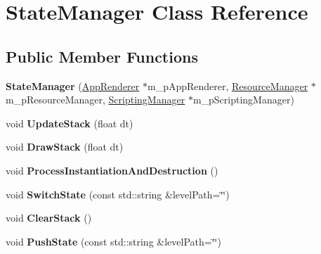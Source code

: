 \hypertarget{classStateManager}{}\section{State\+Manager Class Reference}
\label{classStateManager}
\subsection*{Public Member Functions}
\begin{DoxyCompactItemize}
\item 
\mbox{\label{classStateManager_ace918db0f769af43e0067ac425ef640a}} 
{\bfseries State\+Manager} (\hyperlink{classAppRenderer}{App\+Renderer} $\ast$m\+\_\+p\+App\+Renderer, \hyperlink{classResourceManager}{Resource\+Manager} $\ast$m\+\_\+p\+Resource\+Manager, \hyperlink{classScriptingManager}{Scripting\+Manager} $\ast$m\+\_\+p\+Scripting\+Manager)
\item 
\mbox{\label{classStateManager_a5e4bd4cb8c5928d33a04506dc8c8f350}} 
void {\bfseries Update\+Stack} (float dt)
\item 
\mbox{\label{classStateManager_a2c6bb716a4c6a388f971544c6c23e1d9}} 
void {\bfseries Draw\+Stack} (float dt)
\item 
\mbox{\label{classStateManager_ac88d4e1ff5fab43b754bd3831be4ca97}} 
void {\bfseries Process\+Instantiation\+And\+Destruction} ()
\item 
\mbox{\label{classStateManager_aca3d023f833f9b85b28668e3d3acd2d3}} 
void {\bfseries Switch\+State} (const std\+::string \&level\+Path=\char`\"{}\char`\"{})
\item 
\mbox{\label{classStateManager_a59a5d52d71d785b267f50f386b554787}} 
void {\bfseries Clear\+Stack} ()
\item 
\mbox{\label{classStateManager_a608027305a6a97bdbc958c7e68fcb5bc}} 
void {\bfseries Push\+State} (const std\+::string \&level\+Path=\char`\"{}\char`\"{})
\item 
\mbox{\label{classStateManager_a01cd6f5dafc0add0633b0be231cce665}} 

\end{DoxyCompactItemize}

